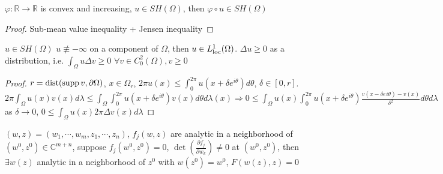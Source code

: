 \documentclass[../main.tex]{subfiles}
\begin{document}
\begin{corollary}
$\varphi:\mathbb R\to\mathbb R$ is convex and increasing, $u\in SH(\Omega)$, then $\varphi\circ u\in SH(\Omega)$
\end{corollary}

\begin{proof}
Sub-mean value inequality + Jensen inequality
\end{proof}

\begin{theorem}
$u\in SH(\Omega)$ $u\not\equiv-\infty$ on a component of $\Omega$, then $u\in L^1_{\operatorname{loc}}(\Omega)$. $\Delta u\geq0$ as a distribution, i.e. $\int_\Omega u\Delta v\geq0$ $\forall v\in C^2_0(\Omega),v\geq0$
\end{theorem}

\begin{proof}
$r=\mathrm{dist}(\operatorname{supp} v,\partial\Omega)$, $x\in\Omega_r$, $2\pi u(x)\leq\int_0^{2\pi}u(x+\delta e^{i\theta})d\theta$, $\delta\in[0,r]$. $2\pi\int_\Omega u(x)v(x)d\lambda\leq\int_\Omega\int_0^{2\pi}u(x+\delta e^{i\theta})v(x)d\theta d\lambda(x)\Rightarrow0\leq\int_\Omega u(x)\int_0^{2\pi}u(x+\delta e^{i\theta})\frac{v(x-\delta e^{}i\theta)-v(x)}{\delta^2}d\theta d\lambda$ as $\delta\to0$, $0\leq\int_\Omega u(x)2\pi\Delta v(x)d\lambda$
\end{proof}

\begin{theorem}
$(w,z)=(w_1,\cdots,w_m,z_1,\cdots, z_n)$, $f_j(w,z)$ are analytic in a neighborhood of $(w^0,z^0)\in\mathbb C^{m+n}$, suppose $f_j(w^0,z^0)=0$, $\det(\frac{\partial f_j}{\partial w_k})\neq0$ at $(w^0,z^0)$, then $\exists w(z)$ analytic in a neighborhood of $z^0$ with $w(z^0)=w^0$, $F(w(z),z)=0$
\end{theorem}
\end{document}
